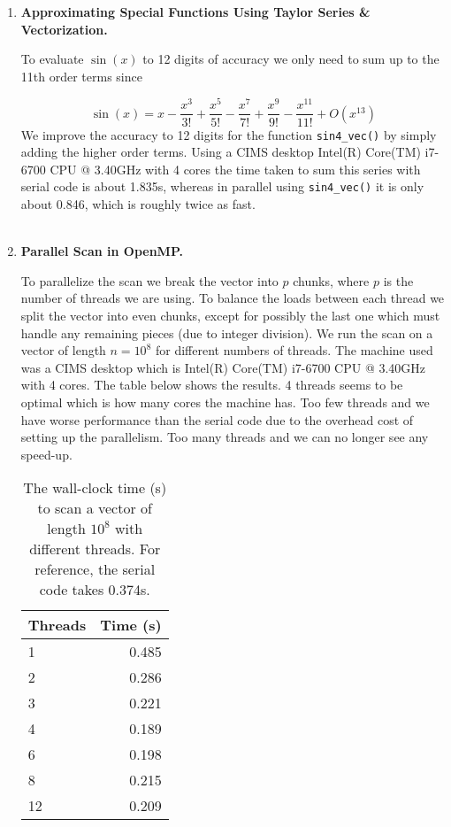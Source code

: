 \documentclass[12pt]{article}
\begin{document}
\begin{enumerate}
  \item {\bf Approximating Special Functions Using Taylor Series \& Vectorization.}




    \par To evaluate $\sin(x)$ to 12 digits of accuracy we only need to sum up to the 11th order terms since

    \[
      \sin(x) = x - \frac{x^3}{3!} + \frac{x^5}{5!} - \frac{x^7}{7!} + \frac{x^9}{9!} - \frac{x^{11}}{11!} + O(x^{13})
    \]
    We improve the accuracy to 12 digits for the function \texttt{sin4\_vec()} by simply adding the higher order terms.  Using a CIMS desktop Intel(R) Core(TM) i7-6700 CPU @ 3.40GHz with 4 cores the time taken to sum this series with serial code is about 1.835s, whereas in parallel using \texttt{sin4\_vec()} it is only about 0.846, which is roughly twice as fast.\\
\\






  \item {\bf Parallel Scan in OpenMP.}


	\par To parallelize the scan we break the vector into $p$ chunks, where $p$ is the number of threads we are using.  To balance the loads between each thread we split the vector into even chunks, except for possibly the last one which must handle any remaining pieces (due to integer division).  We run the scan on a vector of length $n = 10^8$ for different numbers of threads.  The machine used was a CIMS desktop which is Intel(R) Core(TM) i7-6700 CPU @ 3.40GHz with 4 cores.  The table below shows the results.  4 threads seems to be optimal which is how many cores the machine has.  Too few threads and we have worse performance than the serial code due to the overhead cost of setting up the parallelism.  Too many threads and we can no longer see any speed-up.

\begin{table}[H]
\centering
\begin{tabular}{| l | r |}
\hline
Threads & Time (s)\\
\hline
1 & 0.485\\
2 & 0.286\\
3 & 0.221\\
4 & 0.189\\
6 & 0.198\\
8 & 0.215\\
12 & 0.209\\
\hline
\end{tabular}
\caption{The wall-clock time (s) to scan a vector of length $10^8$ with different threads.  For reference, the serial code takes 0.374s.
}
\label{table:timings}
\end{table}



\end{enumerate}
\end{document}
